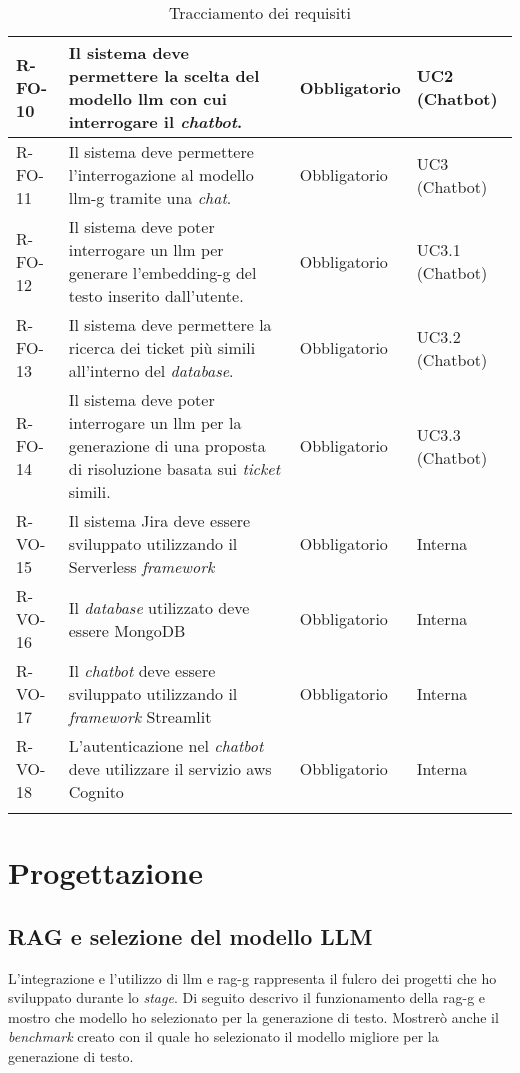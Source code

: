 \begin{longtable}{|p{1.5cm}|p{5.5cm}|p{2cm}|p{2.5cm}|}
    \hline
    \rowcolor{tableevenrow} R-FO-10 & Il sistema deve permettere la scelta del modello \gls{llm} con cui interrogare il \textit{chatbot}. & Obbligatorio & UC2 (Chatbot) \\
    \hline
    R-FO-11 & Il sistema deve permettere l'interrogazione al modello \gls{llm-g} tramite una \textit{chat}. & Obbligatorio & UC3 (Chatbot) \\
    \hline
    \rowcolor{tableevenrow} R-FO-12 & Il sistema deve poter interrogare un \gls{llm} per generare l'\gls{embedding-g} del testo inserito dall'utente. & Obbligatorio & UC3.1 (Chatbot) \\
    \hline
    R-FO-13 & Il sistema deve permettere la ricerca dei ticket più simili all'interno del \textit{database}. & Obbligatorio & UC3.2 (Chatbot) \\
    \hline
    \rowcolor{tableevenrow} R-FO-14 & Il sistema deve poter interrogare un \gls{llm} per la generazione di una proposta di risoluzione basata sui \textit{ticket} simili. & Obbligatorio & UC3.3 (Chatbot) \\
    \hline
    R-VO-15 & Il sistema Jira deve essere sviluppato utilizzando il Serverless \textit{framework}  & Obbligatorio & Interna \\
    \hline
    \rowcolor{tableevenrow} R-VO-16 & Il \textit{database} utilizzato deve essere MongoDB & Obbligatorio & Interna \\
    \hline
    R-VO-17 & Il \textit{chatbot} deve essere sviluppato utilizzando il \textit{framework} Streamlit & Obbligatorio & Interna \\
    \hline
    \rowcolor{tableevenrow} R-VO-18 & L'autenticazione nel \textit{chatbot} deve utilizzare il servizio \gls{aws} Cognito & Obbligatorio & Interna \\

    
    \hline
    \caption{Tracciamento dei requisiti}
    \label{tab:tracciamentoRequisiti}
\end{longtable}

\section{Progettazione}
\subsection{RAG e selezione del modello LLM} \label{sec:rag}
L'integrazione e l'utilizzo di \gls{llm} e \gls{rag-g} rappresenta il fulcro dei progetti che ho sviluppato durante lo \textit{stage}.
Di seguito descrivo il funzionamento della \gls{rag-g} e mostro che modello ho selezionato per la generazione di testo. Mostrerò anche il \textit{benchmark} creato con il quale ho selezionato il modello migliore per la generazione di testo.
